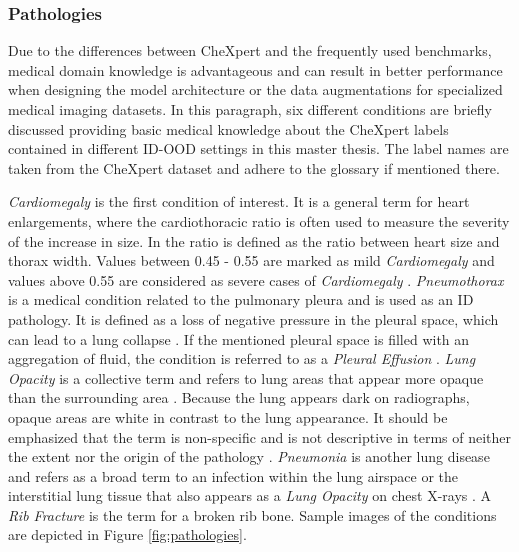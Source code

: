 \subsubsection{Pathologies}
Due to the differences between CheXpert and the frequently used benchmarks, medical domain knowledge is advantageous and can result in better performance when designing the model architecture or the data augmentations for specialized medical imaging datasets.
In this paragraph, six different conditions are briefly discussed providing basic medical knowledge about the CheXpert labels contained in different ID-OOD settings in this master thesis.
The label names are taken from the CheXpert dataset \citep{Irvin2019} and adhere to the glossary \citep{Hansell2008} if mentioned there.
\par
\textit{Cardiomegaly} is the first condition of interest.
It is a general term for heart enlargements, where the cardiothoracic ratio is often used to measure the severity of the increase in size.
In \citep{Dahnert2011} the ratio is defined as the ratio between heart size and thorax width. 
Values between 0.45 - 0.55 are marked as mild \textit{Cardiomegaly} and values above 0.55 are considered as severe cases of \textit{Cardiomegaly} \citep{Dahnert2011}.
\textit{Pneumothorax} is a medical condition related to the pulmonary pleura and is used as an ID pathology.
It is defined as a loss of negative pressure in the pleural space, which can lead to a lung collapse \citep{Dahnert2011, Hansell2008}.
If the mentioned pleural space is filled with an aggregation of fluid, the condition is referred to as a \textit{Pleural Effusion} \citep{Karkhanis2012}.
\textit{Lung Opacity} is a collective term and refers to lung areas that appear more opaque than the surrounding area \citep{Hansell2008}.
Because the lung appears dark on radiographs, opaque areas are white in contrast to the lung appearance.
It should be emphasized that the term is non-specific and is not descriptive in terms of neither the extent nor the origin of the pathology \citep{Hansell2008}.
\textit{Pneumonia} is another lung disease and refers as a broad term to an infection within the lung airspace or the interstitial lung tissue that also appears as a \textit{Lung Opacity} on chest X-rays \citep{Hansell2008}.
A \textit{Rib Fracture} is the term for a broken rib bone.
Sample images of the conditions are depicted in Figure \ref{fig:pathologies}.
